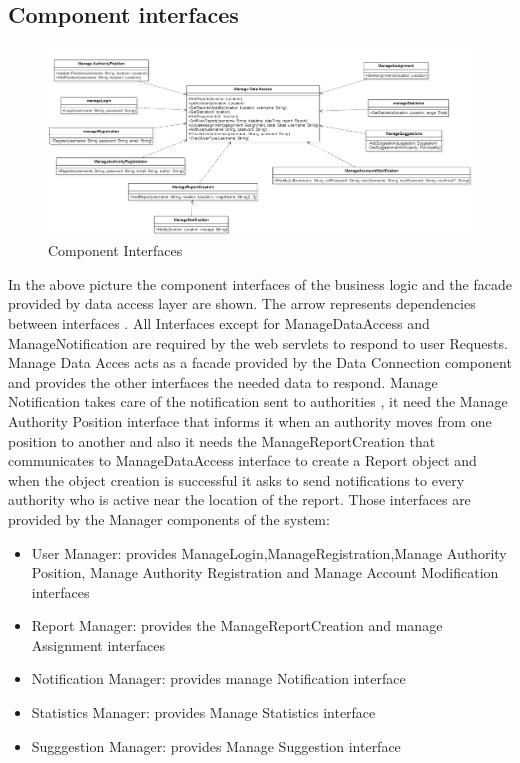 \subsection{Component interfaces}
\begin{figure}[H]
\centering
\includegraphics[width=\textwidth]{Images/Interfaces.png}
\caption{\label{fig:ComWI}Component Interfaces}
\end{figure}
In the above picture the component interfaces of the business logic and the facade provided by data access layer are shown.
The arrow represents dependencies between interfaces .
All Interfaces except for ManageDataAccess and ManageNotification are required by the web servlets to respond to user Requests.
Manage Data Acces acts as a facade provided by the Data Connection component and provides the other interfaces the needed data to respond.
Manage Notification takes care of the notification sent to authorities , it need the  Manage Authority Position interface that informs it when an authority moves from one position to another and also it needs the ManageReportCreation  that communicates to ManageDataAccess interface to create a Report object and when the object creation is successful it asks to send notifications to every authority who is active near the location of the report.
Those interfaces are provided by the Manager components of the system:
\begin{itemize}
\item User Manager: provides ManageLogin,ManageRegistration,Manage Authority Position, Manage Authority Registration and Manage Account Modification interfaces
\item Report Manager: provides the ManageReportCreation and manage Assignment interfaces
\item Notification Manager: provides manage Notification interface
\item Statistics Manager:  provides Manage Statistics interface
\item Sugggestion Manager: provides Manage Suggestion interface
\end{itemize}
